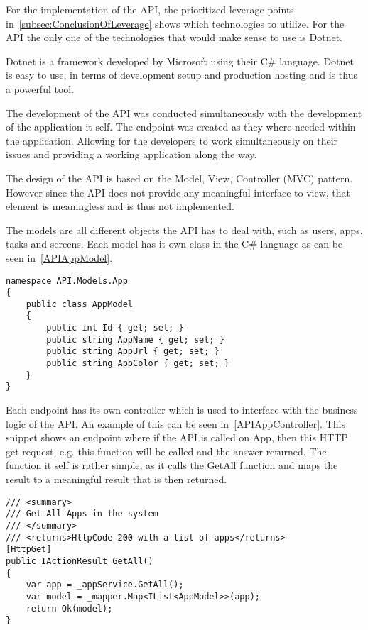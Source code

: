 For the implementation of the API, the prioritized leverage points in~\autoref{subsec:ConclusionOfLeverage} shows which technologies to utilize.
For the API the only one of the technologies that would make sense to use is Dotnet.

Dotnet is a framework developed by Microsoft using their C\# language.
Dotnet is easy to use, in terms of development setup and production hosting and is thus a powerful tool.\cite{DotnetWebsite}

The development of the API was conducted simultaneously with the development of the application it self.
The endpoint was created as they where needed within the application.
Allowing for the developers to work simultaneously on their issues and providing a working application along the way.

The design of the API is based on the Model, View, Controller (MVC) pattern\cite{MVC}.
However since the API does not provide any meaningful interface to view, that element is meaningless and is thus not implemented.

The models are all different objects the API has to deal with, such as users, apps, tasks and screens.
Each model has it own class in the C\# language as can be seen in~\autoref{APIAppModel}.

\begin{lstlisting}[caption={API App model}, label={APIAppModel}, language={CSharp}]
namespace API.Models.App
{
    public class AppModel
    {
        public int Id { get; set; }
        public string AppName { get; set; }
        public string AppUrl { get; set; }
        public string AppColor { get; set; }
    }
}
\end{lstlisting}

Each endpoint has its own controller which is used to interface with the business logic of the API.
An example of this can be seen in~\autoref{APIAppController}.
This snippet shows an endpoint where if the API is called on App, then this HTTP get request, e.g. this function will be called and the answer returned.
The function it self is rather simple, as it calls the GetAll function and maps the result to a meaningful result that is then returned.

\begin{lstlisting}[caption={API App Controller GetAll Function}, label={APIAppController}, language={CSharp}]
/// <summary>
/// Get All Apps in the system
/// </summary>
/// <returns>HttpCode 200 with a list of apps</returns>
[HttpGet]
public IActionResult GetAll()
{
    var app = _appService.GetAll();
    var model = _mapper.Map<IList<AppModel>>(app);
    return Ok(model);
}
\end{lstlisting}

